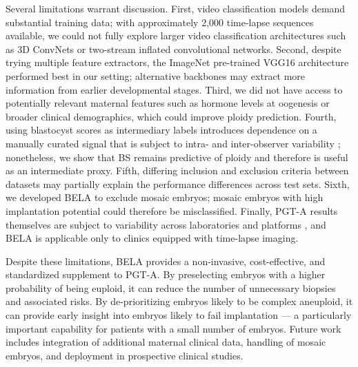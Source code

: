 \documentclass[10pt]{article}
\begin{document}
Several limitations warrant discussion. First, video classification models
demand substantial training data; with approximately 2{,}000 time-lapse
sequences available, we could not fully explore larger video classification
architectures such as 3D ConvNets or two-stream inflated convolutional
networks. Second, despite trying multiple feature extractors, the ImageNet
pre-trained VGG16 architecture performed best in our setting; alternative
backbones may extract more information from earlier developmental stages.
Third, we did not have access to potentially relevant maternal features such
as hormone levels at oogenesis or broader clinical demographics, which could
improve ploidy prediction. Fourth, using blastocyst scores as intermediary
labels introduces dependence on a manually curated signal that is subject to
intra- and inter-observer variability
\citep{paternot2009intra,paternot2011multicentre,hammond2020freeze,richardson2015grading};
nonetheless, we show that BS remains predictive of ploidy and therefore is
useful as an intermediate proxy. Fifth, differing inclusion and exclusion
criteria between datasets may partially explain the performance differences
across test sets. Sixth, we developed BELA to exclude mosaic embryos; mosaic
embryos with high implantation potential could therefore be misclassified.
Finally, PGT-A results themselves are subject to variability across
laboratories and platforms \citep{maxwell2016miscarriage,friedenthal2020ngs},
and BELA is applicable only to clinics equipped with time-lapse imaging.

Despite these limitations, BELA provides a non-invasive, cost-effective, and
standardized supplement to PGT-A. By preselecting embryos with a higher
probability of being euploid, it can reduce the number of unnecessary
biopsies and associated risks. By de-prioritizing embryos likely to be
complex aneuploid, it can provide early insight into embryos likely to fail
implantation --- a particularly important capability for patients with a
small number of embryos. Future work includes integration of additional
maternal clinical data, handling of mosaic embryos, and deployment in
prospective clinical studies.



\end{document}
